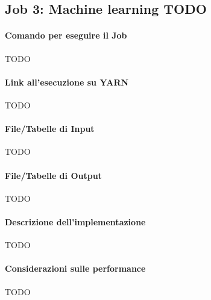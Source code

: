 

\subsection[%
    Job 3: Machine learning%
  ]{%
    Job 3: Machine learning TODO%
  }\label{subsec:job3}

  \paragraph{Comando per eseguire il Job}\label{par:job3:cmd}

  TODO

  \paragraph{Link all'esecuzione su YARN}\label{par:job3:yarn}

  TODO

  \paragraph{File/Tabelle di Input}\label{par:job3:input}

  TODO

  \paragraph{File/Tabelle di Output}\label{par:job3:output}

  TODO

  \paragraph{Descrizione dell'implementazione}\label{par:job3:implementation}

  TODO

  \paragraph{Considerazioni sulle performance}\label{par:job3:performance}

  TODO
